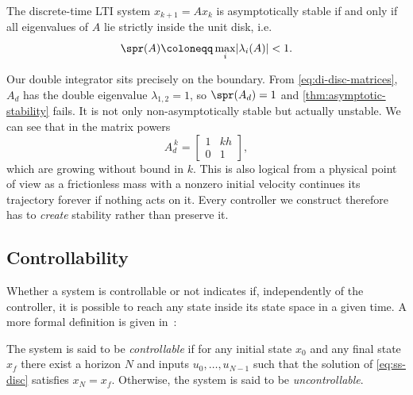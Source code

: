 \begin{theorem}
\label{thm:asymptotic-stability}
The discrete-time LTI system $x_{k+1} = A x_k$ is asymptotically stable if and
only if all eigenvalues of $A$ lie strictly inside the unit disk, i.e.
\begin{equation*}
    \spr(A) \coloneqq \max_{i} \lvert \lambda_i(A) \rvert < 1 .
\end{equation*}
\end{theorem}

Our double integrator sits precisely on the boundary. From
\eqref{eq:di-disc-matrices}, $A_d$ has the double eigenvalue $\lambda_{1,2} = 1$,
so $\spr(A_d) = 1$ and \cref{thm:asymptotic-stability} fails. It is not only
non-asymptotically stable but actually unstable. We can see that in the matrix
powers
\begin{equation}
    \label{eq:di-powers}
    A_d^{\,k} = \begin{bmatrix} 1 & k h \\ 0 & 1 \end{bmatrix},
\end{equation}
which are growing without bound in $k$. This is also logical from a physical
point of view as a frictionless mass with a nonzero initial velocity continues 
its trajectory forever if nothing acts on it. 
Every controller we construct therefore has to \emph{create} stability rather than preserve it.

\subsection{Controllability}
\label{subsec:controllability}

Whether a system is controllable or not indicates if, independently of the
controller, it is possible to reach any state inside its state space in a given
time. A more formal definition is given in~:

\begin{definition}[Controllability]
\label{def:controllability}
The system is said to be \emph{controllable} if for any initial state
$x_0$ and any final state $x_f$ there exist a horizon $N$ and inputs
$u_0, \dots, u_{N-1}$ such that the solution of \eqref{eq:ss-disc} satisfies
$x_N = x_f$. Otherwise, the system is said to be \emph{uncontrollable}.
\end{definition}


